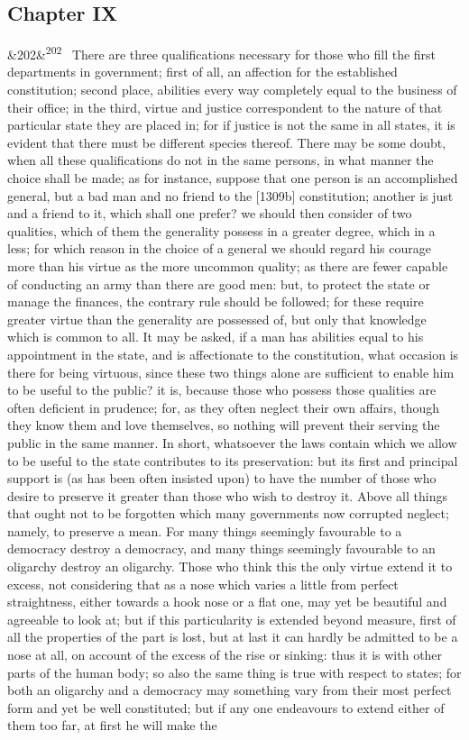 \documentclass[12pt]{article}
\newcommand{\para}[1][]{\par\noindent\ifx&#1&\else\textsuperscript{\footnotesize #1}~\fi}
\begin{document}
\subsection*{Chapter IX}

\para[202] There are three qualifications necessary for those who fill the first departments in government; first of all, an affection for the established constitution; second place, abilities every way completely equal to the business of their office; in the third, virtue and justice correspondent to the nature of that particular state they are placed in; for if justice is not the same in all states, it is evident that there must be different species thereof. There may be some doubt, when all these qualifications do not in the same persons, in what manner the choice shall be made; as for instance, suppose that one person is an accomplished general, but a bad man and no friend to the [1309b] constitution; another is just and a friend to it, which shall one prefer? we should then consider of two qualities, which of them the generality possess in a greater degree, which in a less; for which reason in the choice of a general we should regard his courage more than his virtue as the more uncommon quality; as there are fewer capable of conducting an army than there are good men: but, to protect the state or manage the finances, the contrary rule should be followed; for these require greater virtue than the generality are possessed of, but only that knowledge which is common to all. It may be asked, if a man has abilities equal to his appointment in the state, and is affectionate to the constitution, what occasion is there for being virtuous, since these two things alone are sufficient to enable him to be useful to the public? it is, because those who possess those qualities are often deficient in prudence; for, as they often neglect their own affairs, though they know them and love themselves, so nothing will prevent their serving the public in the same manner. In short, whatsoever the laws contain which we allow to be useful to the state contributes to its preservation: but its first and principal support is (as has been often insisted upon) to have the number of those who desire to preserve it greater than those who wish to destroy it. Above all things that ought not to be forgotten which many governments now corrupted neglect; namely, to preserve a mean. For many things seemingly favourable to a democracy destroy a democracy, and many things seemingly favourable to an oligarchy destroy an oligarchy. Those who think this the only virtue extend it to excess, not considering that as a nose which varies a little from perfect straightness, either towards a hook nose or a flat one, may yet be beautiful and agreeable to look at; but if this particularity is extended beyond measure, first of all the properties of the part is lost, but at last it can hardly be admitted to be a nose at all, on account of the excess of the rise or sinking: thus it is with other parts of the human body; so also the same thing is true with respect to states; for both an oligarchy and a democracy may something vary from their most perfect form and yet be well constituted; but if any one endeavours to extend either of them too far, at first he will make the 
\end{document}
